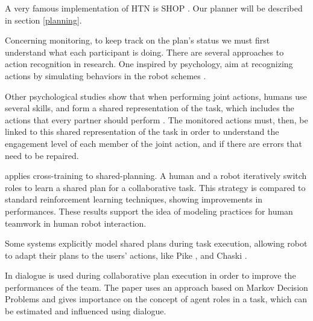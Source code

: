 \documentclass{llncs}
\begin{document}
A very famous implementation of HTN is SHOP \cite{Nau99}. Our planner will be described in section \ref{planning}.


Concerning monitoring, to keep track on the plan's status we must first understand what each participant is doing. There are several approaches to action recognition in research. One inspired by psychology, aim at recognizing actions by simulating behaviors in the robot schemes \cite{gray2005action} \cite{demiris2006hierarchical}.


Other psychological studies show that when performing joint actions, humans use several skills, and form a shared representation of the task, which includes the actions that every partner should perform \cite{sebanz2006joint}. The monitored actions must, then, be linked to this shared representation of the task in order to understand the engagement level of each member of the joint action, and if there are errors that need to be repaired. 

\cite{nikolaidis2013human} applies cross-training  to shared-planning. A human and a robot iteratively switch roles to learn a shared plan for a collaborative task. This strategy is compared to standard reinforcement learning techniques, showing improvements in performances. These results support the idea of modeling practices for human teamwork in human robot interaction.

Some systems explicitly model shared plans during task execution, allowing robot to adapt their plans to the users' actions, like Pike \cite{levine2014concurrent,karpas2015robust}, and Chaski \cite{shah2011improved}.


In \cite{clairrobot} dialogue is used during collaborative plan execution in order to improve the performances of the team. The paper uses an approach based on Markov Decision Problems and gives importance on the concept of agent roles in a task, which can be estimated and influenced using dialogue. 
\end{document}
